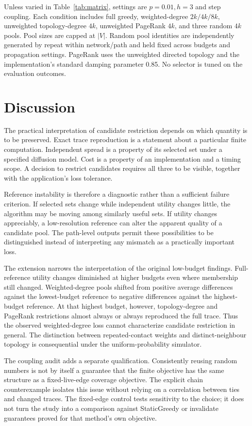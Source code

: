 \documentclass[smallextended]{svjour3}
\begin{document}
Unless varied in Table~\ref{tab:matrix}, settings are $p=0.01,h=3$ and step coupling. Each condition includes full greedy, weighted-degree $2k/4k/8k$, unweighted topology-degree $4k$, unweighted PageRank $4k$, and three random $4k$ pools. Pool sizes are capped at $|V|$. Random pool identities are independently generated by repeat within network/path and held fixed across budgets and propagation settings. PageRank uses the unweighted directed topology and the implementation's standard damping parameter 0.85. No selector is tuned on the evaluation outcomes.


\FloatBarrier

\section{Discussion}
The practical interpretation of candidate restriction depends on which quantity is to be preserved. Exact trace reproduction is a statement about a particular finite computation. Independent spread is a property of its selected set under a specified diffusion model. Cost is a property of an implementation and a timing scope. A decision to restrict candidates requires all three to be visible, together with the application's loss tolerance.

Reference instability is therefore a diagnostic rather than a sufficient failure criterion. If selected sets change while independent utility changes little, the algorithm may be moving among similarly useful sets. If utility changes appreciably, a low-resolution reference can alter the apparent quality of a candidate pool. The path-level outputs permit these possibilities to be distinguished instead of interpreting any mismatch as a practically important loss.

The extension narrows the interpretation of the original low-budget findings. Full-reference utility changes diminished at higher budgets even where membership still changed. Weighted-degree pools shifted from positive average differences against the lowest-budget reference to negative differences against the highest-budget reference. At that highest budget, however, topology-degree and PageRank restrictions almost always or always reproduced the full trace. Thus the observed weighted-degree loss cannot characterize candidate restriction in general. The distinction between repeated-contact weights and distinct-neighbour topology is consequential under the uniform-probability simulator.

The coupling audit adds a separate qualification. Consistently reusing random numbers is not by itself a guarantee that the finite objective has the same structure as a fixed-live-edge coverage objective. The explicit chain counterexample isolates this issue without relying on a correlation between ties and changed traces. The fixed-edge control tests sensitivity to the choice; it does not turn the study into a comparison against StaticGreedy or invalidate guarantees proved for that method's own objective.
\end{document}
